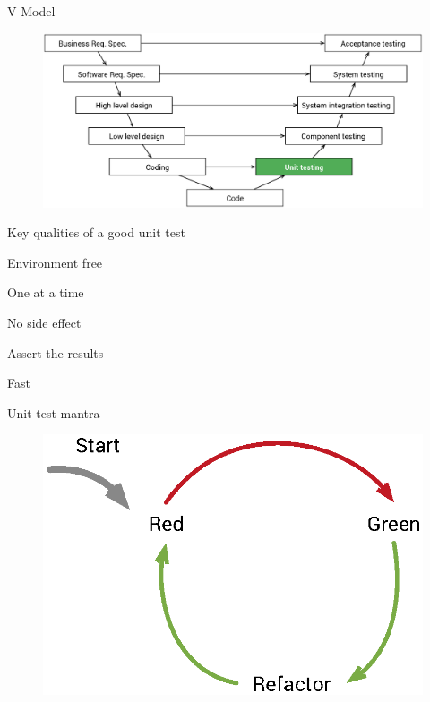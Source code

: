 \documentclass[14pt]{beamer}
\begin{document}
\begin{frame}[plain]{V-Model}
    \begin{figure}
        \center
        \includegraphics[width=\textwidth]{v-model}
    \end{figure}
\end{frame}

\begin{frame}[plain]{Key qualities of a good unit test}
    \begin{fullpageitemize}
        \item<1-> Environment free
        \item<2-> One at a time
        \item<3-> No side effect
        \item<4-> Assert the results
        \item<5-> Fast
    \end{fullpageitemize}
\end{frame}

\begin{frame}[plain]{Unit test mantra}
    \begin{figure}
        \center
        \includegraphics[width=.9\textwidth]{failng-pass-refactor}
        \label{fig:failng-pass-refactor}
    \end{figure}
\end{frame}
\end{document}
